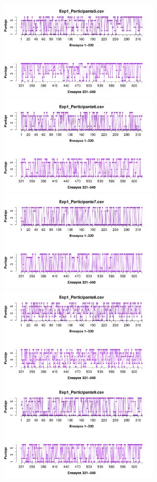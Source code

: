 \documentclass[a4paper ]{article}
\begin{document}
\begin{figure}[th]
\includegraphics[width=9cm, height=5cm]{Figures/Rating_Exp1_P5} \includegraphics[width=9cm, height=5cm]{Figures/Rating_Exp1_P6}
\includegraphics[width=9cm, height=5cm]{Figures/Rating_Exp1_P7} \includegraphics[width=9cm, height=5cm]{Figures/Rating_Exp1_P8} 
\includegraphics[width=9cm, height=5cm]{Figures/Rating_Exp1_P9}
\end{figure}
\end{document}
